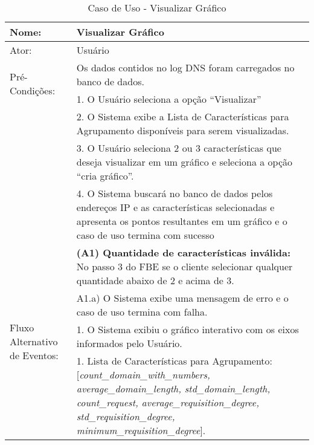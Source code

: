 \begin{table}[]
\centering
\caption{Caso de Uso - Visualizar Gráfico}
\label{tab:use_case_visualize}
\begin{tabular}{|lp{10cm}|}
\hline
Nome: & Visualizar Gráfico  \\ \hline
Ator: & Usuário   \\ \hline
\multirow{2}{*}{Pré-Condições:} & Os dados contidos no log DNS foram carregados no banco de dados.  \\ \hline
\multirow{10}{*}{Fluxo Básico de Eventos:} & 1. O Usuário seleciona a opção ``Visualizar''  \\
 & 2. O Sistema exibe a Lista de Características para Agrupamento disponíveis para serem visualizadas. \\
 & 3. O Usuário seleciona 2 ou 3 características que deseja visualizar em um gráfico e seleciona a opção ``cria gráfico''. \\
 & 4. O Sistema buscará no banco de dados pelos endereços IP e as características selecionadas e apresenta os pontos resultantes em um gráfico e o caso de uso termina com sucesso  \\
 \hline
\multirow{5}{*}{Fluxo Alternativo de Eventos:} & \textbf{(A1) Quantidade de características inválida:} No passo 3 do FBE se o cliente selecionar qualquer quantidade abaixo de 2 e acima de 3.\\
 & A1.a) O Sistema exibe uma mensagem de erro e o caso de uso termina com falha.\\
 \hline
\multirow{2}{*}{Pós-Condições:} & 1. O Sistema exibiu o gráfico interativo com os eixos informados pelo Usuário. \\
\hline
\multirow{5}{*}{Outras Informações:} & 1. Lista de Características para Agrupamento: [\textit{count\_domain\_with\_numbers, average\_domain\_length, std\_domain\_length, count\_request, average\_requisition\_degree, std\_requisition\_degree, minimum\_requisition\_degree}].  \\
\hline 
\end{tabular}
\end{table}

